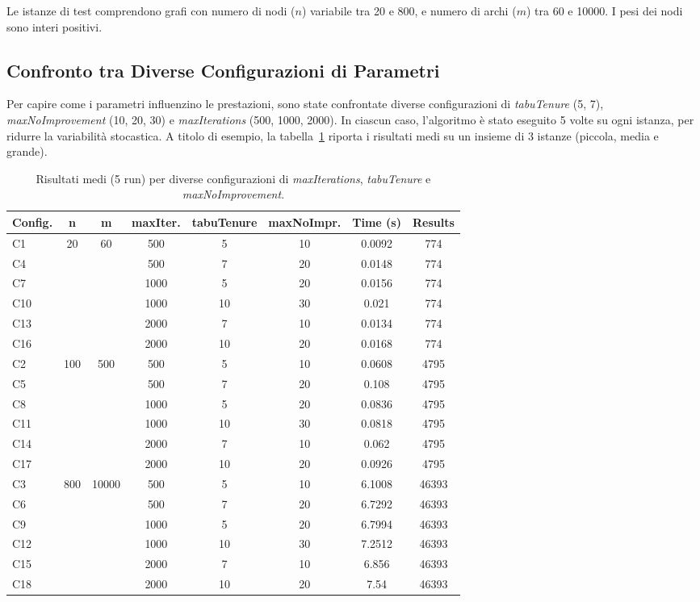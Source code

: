 Le istanze di test comprendono grafi con numero di nodi (\(n\)) variabile tra 20 e 800, e numero di archi (\(m\)) tra 60 e 10000. I pesi dei nodi sono interi positivi.

\subsection{Confronto tra Diverse Configurazioni di Parametri}

Per capire come i parametri influenzino le prestazioni, sono state confrontate diverse configurazioni di \emph{tabuTenure} (5, 7), \emph{maxNoImprovement} (10, 20, 30) e \emph{maxIterations} (500, 1000, 2000). In ciascun caso, l'algoritmo è stato eseguito 5 volte su ogni istanza, per ridurre la variabilità stocastica. A titolo di esempio, la tabella~\ref{tab:times} riporta i risultati medi su un insieme di 3 istanze (piccola, media e grande).

\begin{table}[h!]
\centering
\small
\begin{tabular}{l|c|c|c|c|c|c|c}
\hline
\textbf{Config.} & \textbf{n} & \textbf{m} & \textbf{maxIter.} & \textbf{tabuTenure} & \textbf{maxNoImpr.} & \textbf{Time (s)} & \textbf{Results} \\
\hline
C1  & \multirow{6}{*}{20}  & \multirow{6}{*}{60}   & 500  & 5  & 10 & 0.0092  & 774 \\
C4  &  &  & 500  & 7  & 20 & 0.0148  & 774 \\
C7  &  &  & 1000 & 5  & 20 & 0.0156  & 774 \\
C10 &  &  & 1000 & 10 & 30 & 0.021   & 774 \\
C13 &  &  & 2000 & 7  & 10 & 0.0134  & 774 \\
C16 &  &  & 2000 & 10 & 20 & 0.0168  & 774 \\
\hline \hline
C2  & \multirow{6}{*}{100} & \multirow{6}{*}{500}  & 500  & 5  & 10 & 0.0608  & 4795 \\
C5  &  &  & 500  & 7  & 20 & 0.108   & 4795 \\
C8  &  &  & 1000 & 5  & 20 & 0.0836  & 4795 \\
C11 &  &  & 1000 & 10 & 30 & 0.0818  & 4795 \\
C14 &  &  & 2000 & 7  & 10 & 0.062   & 4795 \\
C17 &  &  & 2000 & 10 & 20 & 0.0926  & 4795 \\
\hline \hline
C3  & \multirow{6}{*}{800} & \multirow{6}{*}{10000} & 500  & 5  & 10 & 6.1008  & 46393 \\
C6  &  &  & 500  & 7  & 20 & 6.7292  & 46393 \\
C9  &  &  & 1000 & 5  & 20 & 6.7994  & 46393 \\
C12 &  &  & 1000 & 10 & 30 & 7.2512  & 46393 \\
C15 &  &  & 2000 & 7  & 10 & 6.856   & 46393 \\
C18 &  &  & 2000 & 10 & 20 & 7.54    & 46393 \\
\hline
\end{tabular}
\caption{Risultati medi (5 run) per diverse configurazioni di \emph{maxIterations}, \emph{tabuTenure} e \emph{maxNoImprovement}.}
\label{tab:times}
\end{table}


